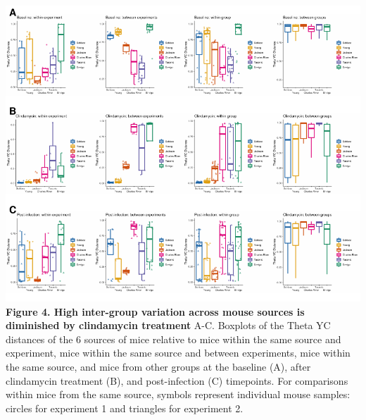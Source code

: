 \documentclass[11pt,]{article}
\begin{document}
\newpage

\includegraphics{figure_4.pdf} \textbf{Figure 4. High inter-group
variation across mouse sources is diminished by clindamycin treatment}
A-C. Boxplots of the Theta YC distances of the 6 sources of mice
relative to mice within the same source and experiment, mice within the
same source and between experiments, mice within the same source, and
mice from other groups at the baseline (A), after clindamycin treatment
(B), and post-infection (C) timepoints. For comparisons within mice from
the same source, symbols represent individual mouse samples: circles for
experiment 1 and triangles for experiment 2.

\newpage
\end{document}
